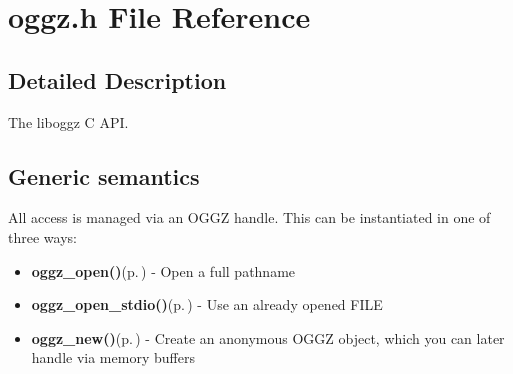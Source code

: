 \section{oggz.h File Reference}
\label{oggz_8h}


\subsection{Detailed Description}
The liboggz C API. 

\subsection{Generic semantics}\label{general}
All access is managed via an OGGZ handle. This can be instantiated in one of three ways:

\begin{itemize}
\item {\bf oggz\_\-open()}{\rm (p.\,\pageref{oggz_8h_a5})} - Open a full pathname\item {\bf oggz\_\-open\_\-stdio()}{\rm (p.\,\pageref{oggz_8h_a6})} - Use an already opened FILE\item {\bf oggz\_\-new()}{\rm (p.\,\pageref{oggz_8h_a4})} - Create an anonymous OGGZ object, which you can later handle via memory buffers\end{itemize}


